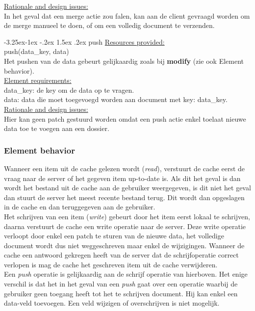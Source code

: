 \documentclass[a4paper,10pt]{article}
\makeatletter
\renewcommand\paragraph{\@startsection{paragraph}{4}{\z@}%
  {-3.25ex\@plus -1ex \@minus -.2ex}%
  {1.5ex \@plus .2ex}%
  {\normalfont\normalsize\bfseries}}
\makeatother
\begin{document}
\underline{Rationale and design issues:}\\
In het geval dat een merge actie zou falen, kan aan de client gevraagd worden om de merge manueel te doen, of om een volledig document te verzenden.

\paragraph{push}
\underline{Resources provided:}\\
push(data\_key, data)\\
Het pushen van de data gebeurt gelijkaardig zoals bij \textbf{modify}  (zie ook Element behavior).\\

\underline{Element requirements:}\\
data\_key: de key om de data op te vragen.\\
data: data die moet toegevoegd worden aan document met key: data\_key.\\

\underline{Rationale and design issues:}\\
Hier kan geen patch gestuurd worden omdat een push actie enkel toelaat nieuwe data toe te voegen aan een dossier.

\subsubsection*{Element behavior}
Wanneer een item uit de cache gelezen wordt (\textit{read}), verstuurt de cache eerst de vraag naar de server of het gegeven item up-to-date is.  Als dit het geval is dan wordt het bestand uit de cache aan de gebruiker weergegeven, is dit niet het geval dan stuurt de server het meest recente bestand terug.  Dit wordt dan opgeslagen in de cache en dan teruggegeven aan de gebruiker.\\

Het schrijven van een item (\textit{write}) gebeurt door het item eerst lokaal te schrijven, daarna verstuurt de cache een write operatie naar de server.  Deze write operatie verloopt door enkel een patch te sturen van de nieuwe data, het volledige document wordt dus niet weggeschreven maar enkel de wijzigingen.  Wanneer de cache een antwoord gekregen heeft van de server dat de schrijfoperatie correct verlopen is mag de cache het geschreven item uit de cache verwijderen.\\

Een \textit{push} operatie is gelijkaardig aan de schrijf operatie van hierboven.  Het enige verschil is dat het in het geval van een \textit{push} gaat over een operatie waarbij de gebruiker geen toegang heeft tot het te schrijven document.  Hij kan enkel een data-veld toevoegen.  Een veld wijzigen of overschrijven is niet mogelijk.\\
\end{document}
